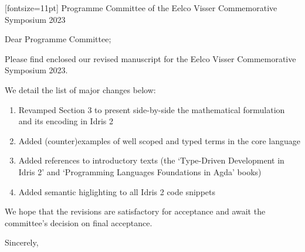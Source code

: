 \documentclass[UKenglish,final,a4paper,oneside]{scrlttr2}
\begin{document}
\begin{letter}[fontsize=11pt]%
  {%
    Programme Committee of the Eelco Visser Commemorative Symposium 2023
  }

  \opening{Dear Programme Committee;}

  Please find enclosed our revised manuscript for the Eelco Visser Commemorative Symposium 2023.

  We detail the list of major changes below:

  \begin{enumerate}
    \item Revamped Section 3 to present side-by-side
          the mathematical formulation and its encoding in Idris 2
    \item Added (counter)examples of well scoped and typed terms in the core language
    \item Added references to introductory texts
       (the `Type-Driven Development in Idris 2'
       and `Programming Languages Foundations in Agda' books)
    \item Added semantic higlighting to all Idris 2 code snippets
  \end{enumerate}

  We hope that the revisions are satisfactory for acceptance and await the committee's decision on final acceptance.

\closing{Sincerely,}
\end{letter}
\end{document}
